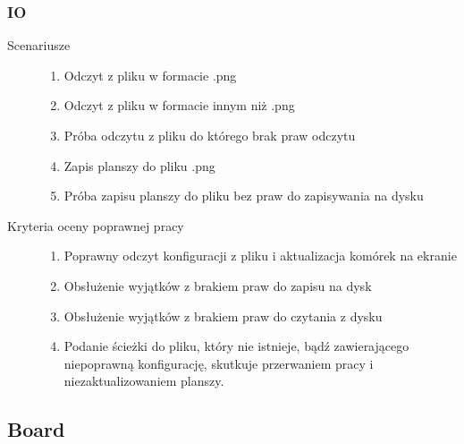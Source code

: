 \documentclass[a4paper,11pt]{article}
\begin{document}
\subsubsection{IO}
\begin{description}

\item[Scenariusze] \hfill
\begin{enumerate}
\item Odczyt z pliku w formacie .png
\item Odczyt z pliku w formacie innym niż .png
\item Próba odczytu z pliku do którego brak praw odczytu
\item Zapis planszy do pliku .png
\item Próba zapisu planszy do pliku bez praw do zapisywania na dysku
\end{enumerate}

\item[Kryteria oceny poprawnej pracy] \hfill
\begin{enumerate}
\item Poprawny odczyt konfiguracji z pliku i aktualizacja komórek na ekranie
\item Obsłużenie wyjątków z brakiem praw do zapisu na dysk
\item Obsłużenie wyjątków z brakiem praw do czytania z dysku
\item Podanie ścieżki do pliku, który nie istnieje, bądź zawierającego niepoprawną konfigurację, skutkuje przerwaniem pracy i niezaktualizowaniem planszy.
\end{enumerate}

\end{description}

\subsection{Board}
\end{document}
